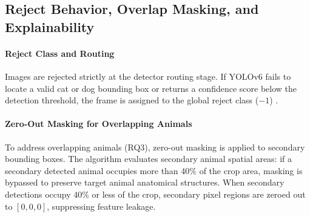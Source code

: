 \begin{table}[h]
  \centering
  \caption{End-to-end and component metrics for the final model and baselines.}
  \label{tab:final_results}
\end{table}

\subsection{Reject Behavior, Overlap Masking, and Explainability}
\label{subsec:reject_behavior_xai}

\paragraph{Reject Class and Routing}
Images are rejected strictly at the detector routing stage. If YOLOv6 fails to locate a valid cat or dog bounding box or returns a confidence score below the detection threshold, the frame is assigned to the global reject class ($-1$) \cite{li2022yolov6}.

\paragraph{Zero-Out Masking for Overlapping Animals}
To address overlapping animals (RQ3), zero-out masking is applied to secondary bounding boxes. The algorithm evaluates secondary animal spatial areas: if a secondary detected animal occupies more than 40\% of the crop area, masking is bypassed to preserve target animal anatomical structures. When secondary detections occupy 40\% or less of the crop, secondary pixel regions are zeroed out to $[0,0,0]$, suppressing feature leakage.

